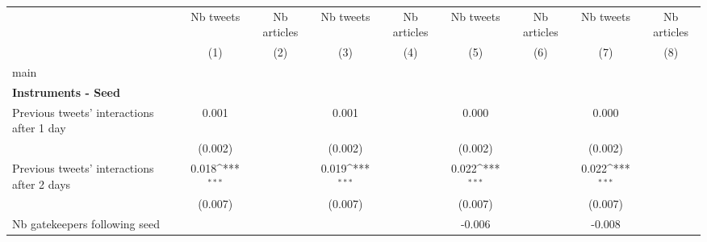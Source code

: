 {
\def\sym#1{\ifmmode^{#1}\else\(^{#1}\)\fi}
\begin{tabular}{l*{8}{c}}
\hline\hline
                    &\multicolumn{1}{c}{Nb tweets}&\multicolumn{1}{c}{Nb articles}&\multicolumn{1}{c}{Nb tweets}&\multicolumn{1}{c}{Nb articles}&\multicolumn{1}{c}{Nb tweets}&\multicolumn{1}{c}{Nb articles}&\multicolumn{1}{c}{Nb tweets}&\multicolumn{1}{c}{Nb articles}\\\cmidrule(lr){2-2}\cmidrule(lr){3-3}\cmidrule(lr){4-4}\cmidrule(lr){5-5}\cmidrule(lr){6-6}\cmidrule(lr){7-7}\cmidrule(lr){8-8}\cmidrule(lr){9-9}
                    &\multicolumn{1}{c}{(1)}         &\multicolumn{1}{c}{(2)}         &\multicolumn{1}{c}{(3)}         &\multicolumn{1}{c}{(4)}         &\multicolumn{1}{c}{(5)}         &\multicolumn{1}{c}{(6)}         &\multicolumn{1}{c}{(7)}         &\multicolumn{1}{c}{(8)}         \\
\hline
main                &                     &                     &                     &                     &                     &                     &                     &                     \\
\textbf{Instruments - Seed}&                     &                     &                     &                     &                     &                     &                     &                     \\
Previous tweets' interactions after 1 day&       0.001         &                     &       0.001         &                     &       0.000         &                     &       0.000         &                     \\
                    &     (0.002)         &                     &     (0.002)         &                     &     (0.002)         &                     &     (0.002)         &                     \\
Previous tweets' interactions after 2 days&       0.018\sym{***}&                     &       0.019\sym{***}&                     &       0.022\sym{***}&                     &       0.022\sym{***}&                     \\
                    &     (0.007)         &                     &     (0.007)         &                     &     (0.007)         &                     &     (0.007)         &                     \\
 Nb gatekeepers following seed&                     &                     &                     &                     &      -0.006         &                     &      -0.008         &                     \\

\end{tabular}}
